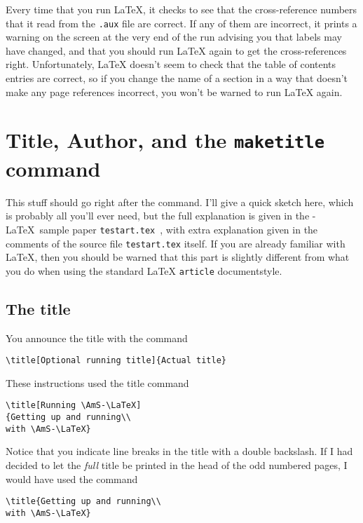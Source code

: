 Every time that you run \LaTeX{}, it checks to see that the
cross-reference numbers that it read from the \verb".aux"
file are correct.  If any of them are incorrect, it
prints a warning on the screen at the very end of the run advising
you that  labels may have changed, and that you should run \LaTeX{}
again to get the cross-references right.  Unfortunately, \LaTeX{}
doesn't seem to check that the table of contents entries are correct,
so if you change the name of a section in a way that doesn't make any
page references incorrect, you won't be warned to run \LaTeX{} again.





\section{Title, Author,  and the {\tt maketitle}
command}

This stuff should go right after the \verb"" command.
I'll give a quick sketch here, which is probably all you'll ever
need, but the full explanation is given in the \AmS-\LaTeX\ sample
paper \verb"testart.tex"~\cite[Page~3]{testart.tex}, with extra
explanation given in the comments of the source file
\verb"testart.tex" itself.  If you are already
familiar with \LaTeX, then you should be warned that this part is
slightly different from what you do when using the standard \LaTeX{}
\verb"article" documentstyle.


\subsection{The title}
You announce the title with the
command
\begin{center}
\verb"\title[Optional running title]{Actual title}"
\end{center}
These instructions used the title command
\begin{verbatim}
\title[Running \AmS-\LaTeX]
{Getting up and running\\
with \AmS-\LaTeX}
\end{verbatim}
Notice that you indicate line breaks in the title with a double
backslash.  If I had decided to let the {\em full\/} title be printed
in the head of the odd numbered pages, I would have used the command
\begin{verbatim}
\title{Getting up and running\\
with \AmS-\LaTeX}
\end{verbatim}


